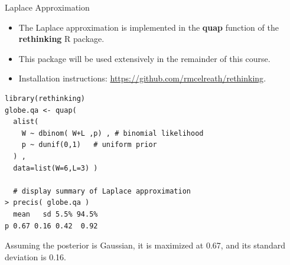 \documentclass[handout]{beamer}
\begin{document}
\begin{frame}[fragile]{Laplace Approximation}



\begin{scriptsize}

\begin{itemize}
 \item The Laplace approximation is implemented in the \textbf{quap} function of the \textbf{rethinking} R package.
 
 \item This package  will be used extensively in the remainder of this course.
 
 \item Installation instructions: \url{https://github.com/rmcelreath/rethinking}.
 
\end{itemize}
 \begin{verbatim}
library(rethinking)
globe.qa <- quap(
  alist(
    W ~ dbinom( W+L ,p) , # binomial likelihood
    p ~ dunif(0,1)   # uniform prior
  ) ,
  data=list(W=6,L=3) )

  # display summary of Laplace approximation
> precis( globe.qa )
  mean   sd 5.5% 94.5%
p 0.67 0.16 0.42  0.92

\end{verbatim}
Assuming the posterior is Gaussian, it is maximized at 0.67, and its standard deviation is 0.16.
\end{scriptsize}


\end{frame}
\end{document}
